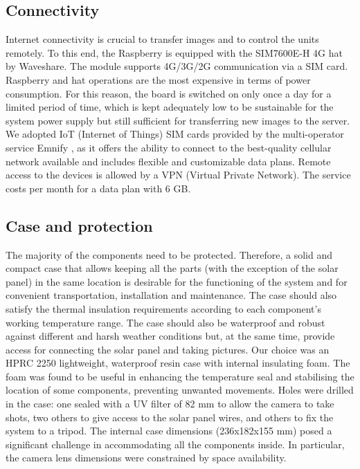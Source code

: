 \subsection{Connectivity}\label{Connectivity}
Internet connectivity is crucial to transfer images and to control the units remotely. To
this end, the Raspberry is equipped with the SIM7600E-H 4G hat by Waveshare. The module
supports 4G/3G/2G communication via a SIM card. Raspberry and hat operations are the most
expensive in terms of power consumption. For this reason, the board is switched on only
once a day for a limited period of time, which is kept adequately low to be sustainable
for the system power supply but still sufficient for transferring new images to the
server. We adopted IoT (Internet of Things) SIM cards provided by the multi-operator
service Emnify \citep{emnify}, as it offers the ability to connect to the best-quality
cellular network available and includes flexible and customizable data plans.
Remote access to the devices is allowed by a VPN (Virtual Private Network).
The service costs  per month for a data plan with 6 GB.

\subsection{Case and protection}\label{Case and protection}
The majority of the components need to be protected. Therefore, a solid and compact case
that allows keeping all the parts (with the exception of the solar panel) in the same
location is desirable for the functioning of the system and for convenient
transportation, installation and maintenance. The case should also satisfy the thermal
insulation requirements according to each component's working temperature range. The case
should also be waterproof and robust against different and harsh weather conditions but,
at the same time, provide access for connecting the solar panel and taking pictures. Our
choice was an HPRC 2250 lightweight, waterproof resin case with internal insulating foam.
The foam was found to be useful in enhancing the temperature seal and stabilising the
location of some components, preventing unwanted movements. Holes were drilled in the
case: one sealed with a UV filter of 82 mm to allow the camera to take shots, two others
to give access to the solar panel wires, and others to fix the system to a tripod. The
internal case dimensions (236x182x155 mm) posed a significant challenge in accommodating
all the components inside. In particular, the camera lens dimensions were constrained by
space availability.

